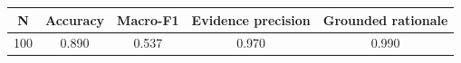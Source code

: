 \begin{tabular}{ccccc}
\toprule
N & Accuracy & Macro-F1 & Evidence precision & Grounded rationale \\
\midrule
100 & 0.890 & 0.537 & 0.970 & 0.990 \\
\bottomrule
\end{tabular}
